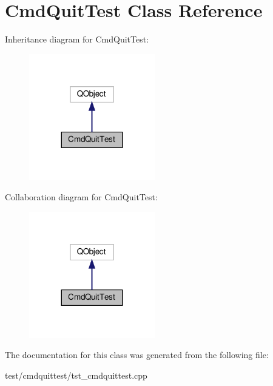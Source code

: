 \hypertarget{classCmdQuitTest}{}\section{Cmd\+Quit\+Test Class Reference}
\label{classCmdQuitTest}


Inheritance diagram for Cmd\+Quit\+Test\+:
\nopagebreak
\begin{figure}[H]
\begin{center}
\leavevmode
\includegraphics[width=155pt]{classCmdQuitTest__inherit__graph}
\end{center}
\end{figure}


Collaboration diagram for Cmd\+Quit\+Test\+:
\nopagebreak
\begin{figure}[H]
\begin{center}
\leavevmode
\includegraphics[width=155pt]{classCmdQuitTest__coll__graph}
\end{center}
\end{figure}


The documentation for this class was generated from the following file\+:\begin{DoxyCompactItemize}
\item 
test/cmdquittest/tst\+\_\+cmdquittest.\+cpp\end{DoxyCompactItemize}
